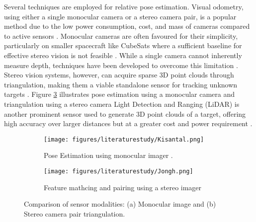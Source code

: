 \noindent
Several techniques are employed for relative pose estimation. Visual odometry, using either a single monocular camera or a stereo camera pair, is a popular method due to the low power consumption, cost, and mass of cameras compared to active sensors \cite{Kisantal, Sabatini}. Monocular cameras are often favoured for their simplicity, particularly on smaller spacecraft like CubeSats where a sufficient baseline for effective stereo vision is not feasible \cite{deJongh2019}. While a single camera cannot inherently measure depth, techniques have been developed to overcome this limitation \cite{Korf}. Stereo vision systems, however, can acquire sparse 3D point clouds through triangulation, making them a viable standalone sensor for tracking unknown targets \cite{Sabatini, Korf}. Figure \ref{fig:sensor_modalities} illustrates pose estimation using a monocular camera and triangulation using a stereo camera \cite{Korf} Light Detection and Ranging (LiDAR) is another prominent sensor used to generate 3D point clouds of a target, offering high accuracy over larger distances but at a greater cost and power requirement \cite{Sabatini, Korf, deJongh2019}.

\begin{figure}[H]
    \centering
    \begin{subfigure}[b]{0.48\textwidth}
        \centering
        \texttt{[image: figures/literaturestudy/Kisantal.png]}
        \caption{Pose Estimation using monocular imager \cite{Kisantal}.}
        \label{fig:sensor_modalities_a}
    \end{subfigure}
    \hfill
    \begin{subfigure}[b]{0.48\textwidth}
        \centering
        \texttt{[image: figures/literaturestudy/Jongh.png]}
        \caption{Feature mathcing and pairing using a stereo imager \cite{Korf}}
        \label{fig:sensor_modalities_b}
    \end{subfigure}
    \caption{Comparison of sensor modalities: (a) Monocular image and (b) Stereo camera pair triangulation.}
    \label{fig:sensor_modalities}
\end{figure}

